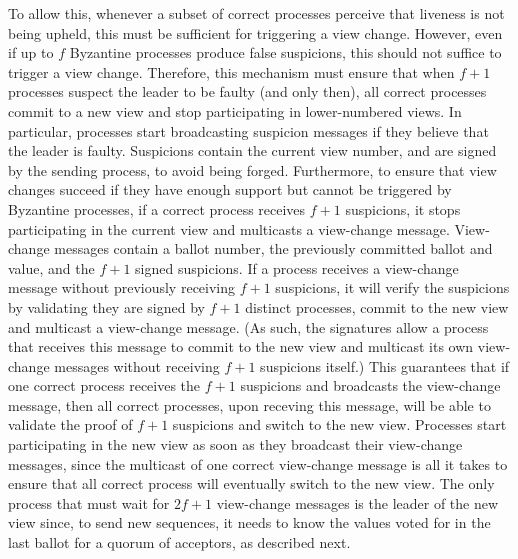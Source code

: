 To allow this, whenever a subset of correct processes perceive that liveness is not being upheld, this must be sufficient for triggering a view change. However, even if up to $f$ Byzantine processes produce false suspicions, this should not suffice to trigger a view change. Therefore, this mechanism must ensure that when $f+1$ processes suspect the leader to be faulty (and only then), all correct processes commit to a new view and stop participating in lower-numbered views. In particular, processes start broadcasting suspicion messages if they believe that the leader is faulty. Suspicions contain the current view number, and are signed by the sending process, to avoid being forged. Furthermore, to ensure that view changes succeed if they have enough support but cannot be triggered by Byzantine processes, if a correct process receives $f+1$ suspicions, it stops participating in the current view and multicasts a view-change message. View-change messages contain a ballot number, the previously committed ballot and value, and the $f+1$ signed suspicions. If a process receives a view-change message without previously receiving $f+1$ suspicions, it will verify the suspicions by validating they are signed by $f+1$ distinct processes, commit to the new view and multicast a view-change message. (As such, the signatures allow a process that receives this message to commit to the new view and multicast its own view-change messages without receiving $f+1$ suspicions itself.)  This guarantees that if one correct process receives the $f+1$ suspicions and broadcasts the view-change message, then all correct processes, upon receving this message, will be able to validate the proof of $f+1$ suspicions and switch to the new view. Processes start participating in the new view as soon as they broadcast their view-change messages, since the multicast of one correct view-change message is all it takes to ensure that all correct process will eventually switch to the new view. The only process that must wait for $2f+1$ view-change messages is the leader of the new view since, to send new sequences, it needs to know the values voted for in the last ballot for a quorum of acceptors, as described next.




